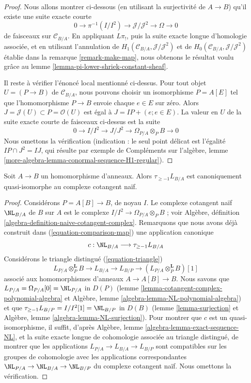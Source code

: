 \begin{proof}
Nous allons montrer ci-dessous (en utilisant la surjectivité de $A \to B$)
qu'il existe une suite exacte courte
$$
0 \to \pi^{-1}(I/I^2) \to \mathcal{J}/\mathcal{J}^2 \to \Omega \to 0
$$
de faisceaux sur $\mathcal{C}_{B/A}$. En appliquant $L\pi_!$, puis la suite
exacte longue d'homologie associée, et en utilisant l'annulation de
$H_1(\mathcal{C}_{B/A}, \mathcal{J}/\mathcal{J}^2)$ et de
$H_0(\mathcal{C}_{B/A}, \mathcal{J}/\mathcal{J}^2)$ établie dans la remarque
\ref{remark-make-map}, nous obtenons le résultat voulu grâce au lemme
\ref{lemma-pi-lower-shriek-constant-sheaf}.

\medskip\noindent
Il reste à vérifier l'énoncé local mentionné ci-dessus. Pour tout objet
$U = (P \to B)$ de $\mathcal{C}_{B/A}$, nous pouvons choisir un isomorphisme
$P = A[E]$ tel que l'homomorphisme $P \to B$ envoie chaque $e \in E$ sur zéro.
Alors
$J = \mathcal{J}(U) \subset P = \mathcal{O}(U)$
est égal à $J = IP + (e; e \in E)$. La valeur en $U$ de la suite exacte courte
de faisceaux ci-dessus est la suite
$$
0 \to I/I^2 \to J/J^2 \to \Omega_{P/A} \otimes_P B \to 0
$$
Nous omettons la vérification (indication : le seul point délicat est l'égalité
$IP \cap J^2 = IJ$, qui résulte par exemple de Compléments sur l'algèbre,
lemme \ref{more-algebra-lemma-conormal-sequence-H1-regular}).
\end{proof}

\begin{lemma}
\label{lemma-relation-with-naive-cotangent-complex}
Soit $A \to B$ un homomorphisme d'anneaux. Alors
$\tau_{\geq -1}L_{B/A}$ est canoniquement quasi-isomorphe au complexe
cotangent naïf.
\end{lemma}

\begin{proof}
Considérons $P = A[B] \to B$, de noyau $I$. Le complexe cotangent naïf
$\NL_{B/A}$ de $B$ sur $A$ est le complexe
$I/I^2 \to \Omega_{P/A} \otimes_P B$ ; voir Algèbre, définition
\ref{algebra-definition-naive-cotangent-complex}. Remarquons que nous avons
déjà construit dans (\ref{equation-comparison-map}) une application canonique
$$
c : \NL_{B/A} \longrightarrow \tau_{\geq -1}L_{B/A}
$$
Considérons le triangle distingué (\ref{equation-triangle})
$$
L_{P/A} \otimes_P^\mathbf{L} B \to L_{B/A} \to L_{B/P} \to 
(L_{P/A} \otimes_P^\mathbf{L} B)[1]
$$
associé aux homomorphismes d'anneaux $A \to A[B] \to B$. Nous savons que
$L_{P/A} = \Omega_{P/A}[0] = \NL_{P/A}$ in $D(P)$
(lemme \ref{lemma-cotangent-complex-polynomial-algebra} et Algèbre, lemme
\ref{algebra-lemma-NL-polynomial-algebra}) et que
$\tau_{\geq -1}L_{B/P} = I/I^2[1] = \NL_{B/P}$ in $D(B)$
(lemme \ref{lemma-surjection} et Algèbre, lemme
\ref{algebra-lemma-NL-surjection}). Pour montrer que $c$ est un
quasi-isomorphisme, il suffit, d'après Algèbre, lemme
\ref{algebra-lemma-exact-sequence-NL}, et la suite exacte longue de cohomologie
associée au triangle distingué, de montrer que les applications
$L_{P/A} \to L_{B/A} \to L_{B/P}$ sont compatibles sur les groupes de
cohomologie avec les applications correspondantes
$\NL_{P/A} \to \NL_{B/A} \to \NL_{B/P}$
du complexe cotangent naïf. Nous omettons la vérification.
\end{proof}

